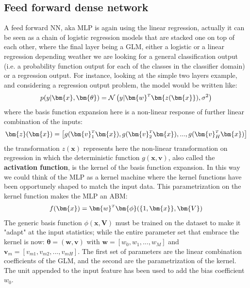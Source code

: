 
\subsection{Feed forward dense network}
%
A feed forward NN, aka \ac{MLP} is again using the linear regression, actually it can be seen as a chain of logistic regression models that are stacked one on top of each other, where the final layer being a \ac{GLM}, either a logistic or a linear regression depending weather we are looking for a general classification output (i.e. a probability function output for each of the classes in the classifier domain) or a regression output. 
For instance, looking at the simple two layers example, and considering a regression output problem, the model would be written like:
\begin{equation}
    p(y|\bm{x},\bm{\theta}) = \mathcal{N}\left(y|\transpose{\bm{w}}\bm{z(\bm{x}}), \sigma^2 \right)
    \label{eq:mlp_a}
\end{equation}
where the basis function expansion here is a non-linear response of further linear combination of the inputs:
\begin{equation}
    \bm{z}(\bm{x}) = \left[ g(\transpose{\bm{v}_1}\bm{x}), g(\transpose{\bm{v}_2}\bm{x}), ..., g(\transpose{\bm{v}_H}\bm{x})
    \right]
    \label{eq:mlp_b}
\end{equation}
the transformation $z(\bm{x})$ represents here the non-linear transformation on regression in which the deterministic function $g(\bm{x},\bm{v})$, also called the \textbf{activation function}, is the kernel of the basis function expansion. In this way we could think of the \acl{MLP} as a kernel machine where the kernel functions have been opportunely shaped to match the input data. This parametrization on the kernel function makes the \acl{MLP} an \ac{ABM}:
\begin{equation}
    f(\bm{x}) = \transpose{\bm{w}}\bm{\phi}(\{1,\bm{x}\}, \bm{V})
\end{equation}
The generic basis function $\phi(\bm{x},\bm{V})$ must be trained on the dataset to make it "adapt" at the input statistics; while
the entire parameter set that embrace the kernel is now: $\bm{\theta} = (\bm{w}, \bm{v})$ with $\bm{w} = [w_0, w_1, ..., w_M]$ and $\bm{v}_m = [v_{m1}, v_{m2}, ..., v_{mH}]$. The first set of parameters are the linear combination coefficients of the \ac{GLM}, and the second are the parametrization of the kernel. The unit appended to the input feature has been used to add the bias coefficient $w_0$.

